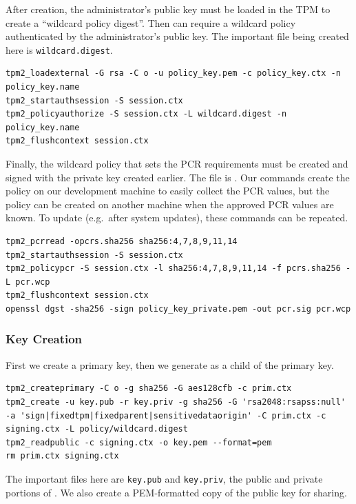 \documentclass[12pt,letterpaper]{kuthesis}
\begin{document}
After creation, the administrator's public key must be loaded in the TPM to create a ``wildcard policy digest''.
Then \pk can require a wildcard policy authenticated by the administrator's public key.
The important file being created here is \verb|wildcard.digest|.
\begin{lstlisting}[style=bash]
tpm2_loadexternal -G rsa -C o -u policy_key.pem -c policy_key.ctx -n policy_key.name
tpm2_startauthsession -S session.ctx
tpm2_policyauthorize -S session.ctx -L wildcard.digest -n policy_key.name
tpm2_flushcontext session.ctx
\end{lstlisting}

Finally, the wildcard policy that sets the PCR requirements must be created and signed with the private key created earlier.
The file \pcrpolicy is \wcp.
Our commands create the policy on our development machine to easily collect the PCR values,
but the policy can be created on another machine when the approved PCR values are known.
To update \wcp (e.g.\ after system updates), these commands can be repeated.
\begin{lstlisting}[style=bash]
tpm2_pcrread -opcrs.sha256 sha256:4,7,8,9,11,14
tpm2_startauthsession -S session.ctx
tpm2_policypcr -S session.ctx -l sha256:4,7,8,9,11,14 -f pcrs.sha256 -L pcr.wcp
tpm2_flushcontext session.ctx
openssl dgst -sha256 -sign policy_key_private.pem -out pcr.sig pcr.wcp
\end{lstlisting}

\subsubsection{Key Creation}
First we create a primary key,
then we generate \pk as a child of the primary key.
\begin{lstlisting}[style=bash]
tpm2_createprimary -C o -g sha256 -G aes128cfb -c prim.ctx
tpm2_create -u key.pub -r key.priv -g sha256 -G 'rsa2048:rsapss:null' -a 'sign|fixedtpm|fixedparent|sensitivedataorigin' -C prim.ctx -c signing.ctx -L policy/wildcard.digest
tpm2_readpublic -c signing.ctx -o key.pem --format=pem
rm prim.ctx signing.ctx
\end{lstlisting}
The important files here are \verb|key.pub| and \verb|key.priv|, the public and private portions of \pk.
We also create a PEM-formatted copy of the public key for sharing.
\end{document}
